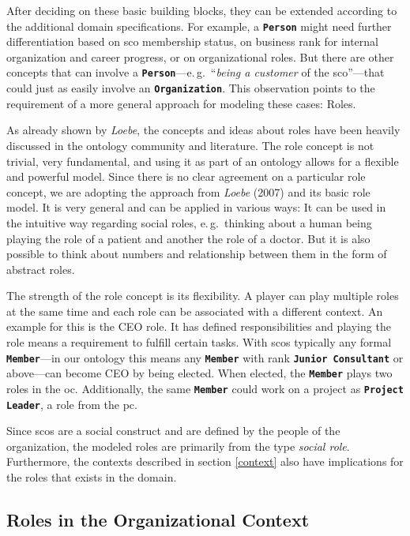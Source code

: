 \documentclass[a4paper, DIV=13, BCOR=0cm]{scrbook}
\newcommand{\eg}{e.\,g.\ }
\newcommand{\class}[1]{\texttt{\textbf{#1}}}
\begin{document}
After deciding on these basic building blocks, they can be extended according to the additional domain specifications. For example, a \class{Person} might need further differentiation based on \gls{sco} membership status, on business rank for internal organization and career progress, or on organizational roles. But there are other concepts that can involve a \class{Person}---\eg \enquote{\textit{being a customer} of the \gls{sco}}---that could just as easily involve an \class{Organization}. This observation points to the requirement of a more general approach for modeling these cases: Roles.

As already shown by \textit{Loebe}, the concepts and ideas about roles have been heavily discussed in the ontology community and literature. \cite[p.\,130~1.2]{loebe2007abstract} The role concept is not trivial, very fundamental, and using it as part of an ontology allows for a flexible and powerful model.
Since there is no clear agreement on a particular role concept, we are adopting the approach from \textit{Loebe} (2007) and its basic role model. It is very general and can be applied in various ways: It can be used in the intuitive way regarding social roles, \eg thinking about a human being playing the role of a patient and another the role of a doctor. But it is also possible to think about numbers and relationship between them in the form of abstract roles. \cite[p.\,131--133]{loebe2007abstract}

The strength of the role concept is its flexibility. A player can play multiple roles at the same time and each role can be associated with a different context. An example for this is the CEO role. It has defined responsibilities and playing the role means a requirement to fulfill certain tasks. With \glspl{sco} typically any formal \class{Member}---in our ontology this means any \class{Member} with rank \class{Junior Consultant} or above---can become CEO by being elected. When elected, the \class{Member} plays two roles in the \gls{oc}. Additionally, the same \class{Member} could work on a project as \class{Project Leader}, a role from the \gls{pc}.

Since \glspl{sco} are a social construct and are defined by the people of the organization, the modeled roles are primarily from the type \textit{social role}. Furthermore, the contexts described in section \ref{context} also have implications for the roles that exists in the domain.

\subsection{Roles in the Organizational Context}
\end{document}
